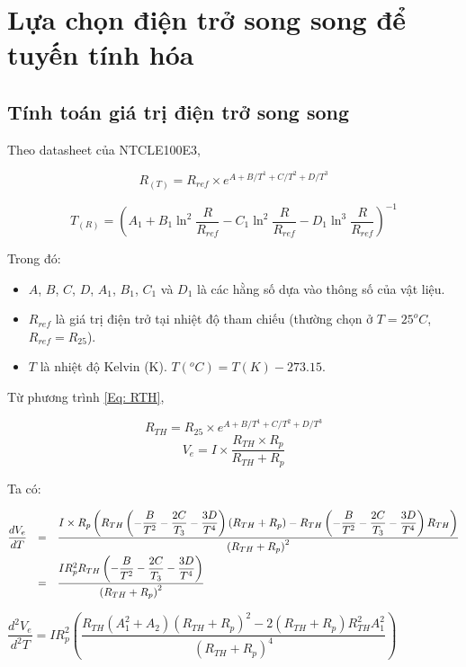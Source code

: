 \section{Lựa chọn điện trở song song để tuyến tính hóa}

\subsection{Tính toán giá trị điện trở song song}

Theo datasheet của NTCLE100E3,

\begin{equation}
	R_{(T)} = R_{ref} \times e^{A + B/T^{1} + C/T^{2} + D/T^{3}}
	\label{Eq: RTH}
\end{equation}

\[
T_{(R)} = \left( A_{1} + B_{1} \ln^{2} \frac{R}{R_{ref}} - C_{1} \ln^2 \frac{R}{R_{ref}} - D_{1} \ln^3 \frac{R}{R_{ref}} \right)^{-1}
\]

Trong đó:

\begin{itemize}[label=-, leftmargin=2cm]
	\item $A$, $B$, $C$, $D$, $A_{1}$, $B_{1}$, $C_{1}$ và $D_{1}$ là các hằng số dựa vào thông số của vật liệu.
	\item $R_{ref}$ là giá trị điện trở tại nhiệt độ tham chiếu (thường chọn ở $T = 25^{o}C$, $ R_{ref} = R_{25}$).
	\item $T$ là nhiệt độ Kelvin (K). $T(^{o}C) = T(K) - 273.15$.
\end{itemize}

Từ phương trình \ref{Eq: RTH}, 

\[ R_{TH} = R_{25} \times e^{A + B/T^{1} + C/T^{2} + D/T^{3}} \]
\[ V_{e} = I \times \dfrac{R_{TH} \times R_{p}}{R_{TH} + R_{p}} \]

Ta có:

$
	\begin{matrix}
		\dfrac{dV_{e}}{dT} & = & \dfrac{I\times R_{p} \left( R_{TH} \left( -\dfrac{B}{T^{2}} - \dfrac{2C}{T_{3}} - \dfrac{3D}{T^{4}} \right) \left( R_{TH} + R_{p} \right) - R_{TH} \left( -\dfrac{B}{T^{2}} - \dfrac{2C}{T_{3}} - \dfrac{3D}{T^{4}} \right)R_{TH} \right)}{\left(R_{TH} + R_{p}\right)^{2}} \\[10pt]
						   & = & \dfrac{I R_{p}^{2} R_{TH} \left( -\dfrac{B}{T^{2}} - \dfrac{2C}{T_{3}} - \dfrac{3D}{T^{4}} \right)}{\left(R_{TH} + R_{p}\right)^{2}} \hfill
	\end{matrix}
$

$
	\dfrac{d^{2}V_{e}}{d^{2}T} = I R_{p}^{2} \left( \dfrac{ R_{TH} (A_{1}^{2} + A_{2})(R_{TH} + R_{p})^{2} -2(R_{TH} + R_{p})R_{TH}^{2}A_{1}^{2} }{(R_{TH} + R_{p})^{4}} \right)
$

